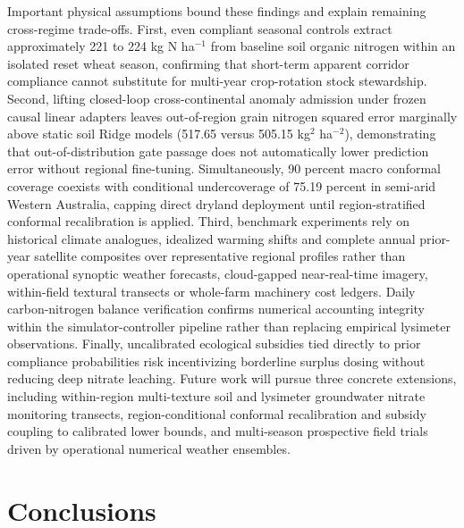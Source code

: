 \documentclass[11pt,a4paper]{article}
\begin{document}
Important physical assumptions bound these findings and explain remaining cross-regime trade-offs. First, even compliant seasonal controls extract approximately 221 to 224 kg N ha$^{-1}$ from baseline soil organic nitrogen within an isolated reset wheat season, confirming that short-term apparent corridor compliance cannot substitute for multi-year crop-rotation stock stewardship. Second, lifting closed-loop cross-continental anomaly admission under frozen causal linear adapters leaves out-of-region grain nitrogen squared error marginally above static soil Ridge models (517.65 versus 505.15 kg$^2$ ha$^{-2}$), demonstrating that out-of-distribution gate passage does not automatically lower prediction error without regional fine-tuning. Simultaneously, 90 percent macro conformal coverage coexists with conditional undercoverage of 75.19 percent in semi-arid Western Australia, capping direct dryland deployment until region-stratified conformal recalibration is applied. Third, benchmark experiments rely on historical climate analogues, idealized warming shifts and complete annual prior-year satellite composites over representative regional profiles rather than operational synoptic weather forecasts, cloud-gapped near-real-time imagery, within-field textural transects or whole-farm machinery cost ledgers. Daily carbon-nitrogen balance verification confirms numerical accounting integrity within the simulator-controller pipeline rather than replacing empirical lysimeter observations. Finally, uncalibrated ecological subsidies tied directly to prior compliance probabilities risk incentivizing borderline surplus dosing without reducing deep nitrate leaching. Future work will pursue three concrete extensions, including within-region multi-texture soil and lysimeter groundwater nitrate monitoring transects, region-conditional conformal recalibration and subsidy coupling to calibrated lower bounds, and multi-season prospective field trials driven by operational numerical weather ensembles.

\FloatBarrier

\section{Conclusions}
\end{document}
